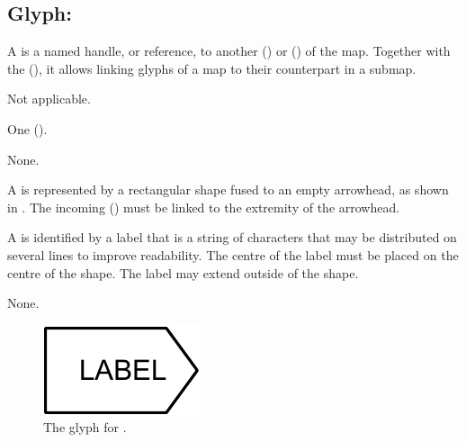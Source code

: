 \subsection{Glyph: }
\label{sec:tag}

A  is a named handle, or reference, to another  () or  () of the map. Together with the  (), it allows linking glyphs of a map to their counterpart in a submap.

\begin{glyphDescription}

\glyphSboTerm Not applicable.

\glyphIncoming
One  ().

\glyphOutgoing
None.

\glyphContainer A  is represented by a rectangular shape fused to an empty arrowhead, as shown in .
The incoming  () must be linked to the extremity of the arrowhead.

\glyphLabel A  is identified by a label that is  a string of characters that may be distributed on several lines to improve readability.
The centre of the label must be placed on the centre of the shape.
The label may extend outside of the shape.

\glyphAux 
None.

\end{glyphDescription}

\begin{figure}[H]
  \centering
  \includegraphics{images/build/tag.pdf}
  \caption{The \AF glyph for .}
  \label{fig:tag}
\end{figure}

